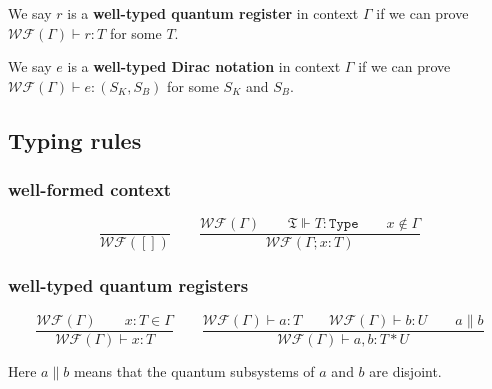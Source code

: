 \begin{definition}
  We say $r$ is a \textbf{well-typed quantum register} in context $\Gamma$ if we can prove $\mathcal{WF}(\Gamma) \vdash r : T$ for some $T$.
\end{definition}

\begin{definition}
  We say $e$ is a \textbf{well-typed Dirac notation} in context $\Gamma$ if we can prove $\mathcal{WF}(\Gamma) \vdash e : (S_K, S_B)$ for some $S_K$ and $S_B$.
\end{definition}

\subsection{Typing rules}

\subsubsection*{well-formed context}

$$
\frac{}{\mathcal{WF}([])}
\qquad 
\frac{\mathcal{WF}(\Gamma)\qquad \mathfrak{T}\Vdash T : \texttt{Type}\qquad x \notin \Gamma}{\mathcal{WF}(\Gamma; x : T)}
$$

\subsubsection*{well-typed quantum registers}
$$
\frac{\mathcal{WF}(\Gamma)\qquad x:T \in \Gamma}{\mathcal{WF}(\Gamma) \vdash x : T}
\qquad
\frac{\mathcal{WF}(\Gamma)\vdash a : T\qquad \mathcal{WF}(\Gamma) \vdash b : U \qquad a \| b}{\mathcal{WF}(\Gamma) \vdash a, b : T * U}
$$

Here $a \| b$ means that the quantum subsystems of $a$ and $b$ are disjoint.

